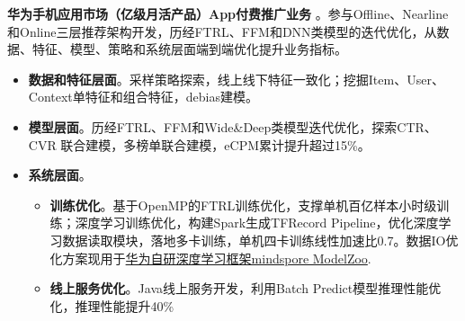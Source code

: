 \documentclass{resume}
\begin{document}
\begin{onehalfspacing}
\textbf{华为手机应用市场（亿级月活产品）App付费推广业务} 。参与Offline、Nearline和Online三层推荐架构开发，历经FTRL、FFM和DNN类模型的迭代优化，从数据、特征、模型、策略和系统层面端到端优化提升业务指标。  
\begin{itemize}%
  \item \textbf{数据和特征层面}。采样策略探索，线上线下特征一致化；挖掘Item、User、Context单特征和组合特征，debias建模。
  \item \textbf{模型层面}。历经FTRL、FFM和Wide\&Deep类模型迭代优化，探索CTR、CVR 联合建模，多榜单联合建模，eCPM累计提升超过15\%。
  \item \textbf{系统层面}。
    \begin{itemize}
    \item \textbf{训练优化}。基于OpenMP的FTRL训练优化，支撑单机百亿样本小时级训练；深度学习训练优化，构建Spark生成TFRecord Pipeline，优化深度学习数据读取模块，落地多卡训练，单机四卡训练线性加速比0.7。数据IO优化方案现用于\href{https://github.com/mindspore-ai/mindspore/blob/master/model_zoo/official/recommend/wide_and_deep/src/datasets.py}{华为自研深度学习框架mindspore ModelZoo}.
    \item \textbf{线上服务优化}。Java线上服务开发，利用Batch Predict模型推理性能优化，推理性能提升40\%
  \end{itemize}
\end{itemize}
\end{onehalfspacing}
\end{document}
